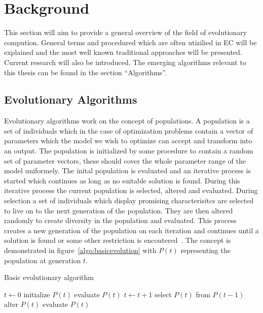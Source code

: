 \section{Background}

This section will aim to provide a general overview of the field of evolutionary compution. General terms and procedured which are often utizilied in EC will be explained and the most well known traditional approaches will be presented. Current research will also be introduced. The emerging algorithms relevant to this thesis can be found in the section ``Algorithms''.

\subsection{Evolutionary Algorithms}

Evolutionary algorithms work on the concept of populations. A population is a set of individuals which in the case of optimization problems contain a vector of parameters which the model we wish to optimize can accept and transform into an output. The population is initialized by some procedure to contain a random set of parameter vectors, these should cover the whole parameter range of the model uniformely. The inital population is evaluated and an iterative process is started which continues as long as no suitable solution is found. During this iterative process the current population is selected, altered and evaluated. During selection a set of individuals which display promising characterisitcs are selected to live on to the next generation of the population. They are then altered randomly to create diversity in the population and evaluated. This process creates a new generation of the population on each iteration and continues until a solution is found or some other restriction is encoutered~\cite{Eiben20021}. The concept is demonstrated in figure~\ref{algo:basicevolution} with $P(t)$ representing the population at generation $t$.

\begin{algorithm}[h]

  \caption{Basic evolutionary algorithm}
  \label{algo:basicevolution}
    \begin{algorithmic}
       \State $t\gets 0$
       \State initialize $P(t)$
       \State evaluate $P(t)$
        \State $t\gets t + 1$
        \State select $P(t)$ from $P(t-1)$
        \State alter $P(t)$
        \State evaluate $P(t)$
       \EndWhile
    \end{algorithmic}

\end{algorithm}

